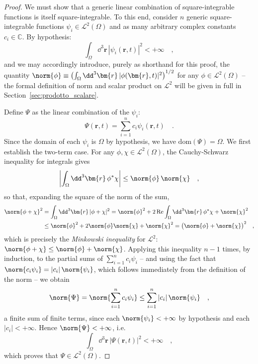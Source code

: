 \begin{proof}
    We must show that a generic linear combination of square-integrable functions is itself square-integrable. To this end, consider $n$ generic square-integrable functions $\psi_i \in \mathcal{L}^2(\Omega)$ and as many arbitrary complex constants $c_i \in \mathbb{C}$. By hypothesis:
    \[
        \int_{\Omega} \dd^3{\bm{r}} \, |\psi_i(\bm{r},t)|^2 < +\infty \quad,
    \]
    and we may accordingly introduce, purely as shorthand for this proof, the quantity $\norm{\phi} \equiv \left(\int_\Omega \dd^3{\bm{r}}\,|\phi(\bm{r},t)|^2\right)^{1/2}$ for any $\phi \in \mathcal{L}^2(\Omega)$ -- the formal definition of norm and scalar product on $\mathcal{L}^2$ will be given in full in Section~\ref{sec:prodotto_scalare}.

    Define $\Psi$ as the linear combination of the $\psi_i$:
    \[
        \Psi(\bm{r},t) = \sum_{i=1}^n c_i \psi_i(\bm{r},t) \quad.
    \]
    Since the domain of each $\psi_i$ is $\Omega$ by hypothesis, we have $\text{dom}(\Psi) = \Omega$. We first establish the two-term case. For any $\phi, \chi \in \mathcal{L}^2(\Omega)$, the Cauchy-Schwarz inequality for integrals gives
    \[
        \left|\int_\Omega \dd^3{\bm{r}}\,\phi^*\chi\right| \le \norm{\phi}\,\norm{\chi} \quad,
    \]
    so that, expanding the square of the norm of the sum,
    \[
        \begin{aligned}
            \norm{\phi+\chi}^2 &= \int_\Omega \dd^3{\bm{r}}\,|\phi+\chi|^2 = \norm{\phi}^2 + 2\,\text{Re}\int_\Omega \dd^3{\bm{r}}\,\phi^*\chi + \norm{\chi}^2 \\
            &\le \norm{\phi}^2 + 2\norm{\phi}\norm{\chi} + \norm{\chi}^2 = \big(\norm{\phi}+\norm{\chi}\big)^2 \quad,
        \end{aligned}
    \]
    which is precisely the \emph{Minkowski inequality} for $\mathcal{L}^2$: $\norm{\phi+\chi} \le \norm{\phi} + \norm{\chi}$. Applying this inequality $n-1$ times, by induction, to the partial sums of $\sum_{i=1}^n c_i\psi_i$ -- and using the fact that $\norm{c_i\psi_i} = |c_i|\,\norm{\psi_i}$, which follows immediately from the definition of the norm -- we obtain
    \[
        \norm{\Psi} = \norm{\sum_{i=1}^n c_i\psi_i} \le \sum_{i=1}^n |c_i|\,\norm{\psi_i} \quad,
    \]
    a finite sum of finite terms, since each $\norm{\psi_i} < +\infty$ by hypothesis and each $|c_i| < +\infty$. Hence $\norm{\Psi} < +\infty$, i.e.
    \[
        \int_\Omega \dd^3{\bm{r}}\,|\Psi(\bm{r},t)|^2 < +\infty \quad,
    \]
    which proves that $\Psi \in \mathcal{L}^2(\Omega)$.
\end{proof}

